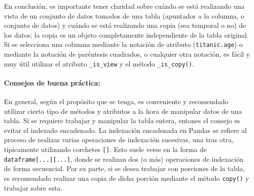 \noindent En conclusión, es importante tener claridad sobre cuándo se está realizando una vista de un conjunto de datos tomados de una tabla (apuntador a la columna, o conjunto de datos) y cuándo se está realizando una copia (sea temporal o no) de los datos; la copia es un objeto completamente independiente de la tabla original. Si se selecciona una columna mediante la notación de atributo (\texttt{titanic.age}) o mediante la notación de paréntesis cuadrados, o cualquier otra notación, es fácil y muy útil utilizar el atributo \texttt{\_is\_view} y el método \texttt{\_is\_copy()}. 
\paragraph{Consejos de buena práctica:} En general, según el propósito que se tenga, es conveniente y recomendado utilizar cierto tipo de métodos y atributos a la hora de manipular datos de una tabla.
Si se requiere trabajar y manipular la tabla entera, entones el consejo es evitar el indexado encadenado. La indexación encadenada en Pandas se refiere al proceso de realizar varias operaciones de indexación sucesivas, una tras otra, típicamente utilizando corchetes \texttt{[]}. Esto suele verse en la forma de \texttt{dataframe[...][...]}, donde se realizan dos (o más) operaciones de indexación de forma secuencial. Por su parte, si se desea trabajar con porciones de la tabla, es recomendado realizar una copia de dicha porción mediante el método \texttt{copy()} y trabajar sobre esta.
